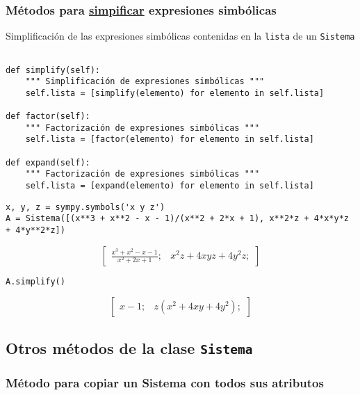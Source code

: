 \documentclass[11pt]{report}
\begin{document}
\subsubsection{Métodos para \href{https://docs.sympy.org/latest/tutorials/intro-tutorial/simplification.html}{simpificar} expresiones simbólicas}
\label{sec:org1226807}

Simplificación de las expresiones simbólicas contenidas en la \texttt{lista} de un \texttt{Sistema}

\begin{verbatim}

def simplify(self):
    """ Simplificación de expresiones simbólicas """
    self.lista = [simplify(elemento) for elemento in self.lista]
                                                               
def factor(self):
    """ Factorización de expresiones simbólicas """
    self.lista = [factor(elemento) for elemento in self.lista]

def expand(self):
    """ Factorización de expresiones simbólicas """
    self.lista = [expand(elemento) for elemento in self.lista]

\end{verbatim}

\begin{verbatim}
x, y, z = sympy.symbols('x y z')
A = Sistema([(x**3 + x**2 - x - 1)/(x**2 + 2*x + 1), x**2*z + 4*x*y*z + 4*y**2*z])
\end{verbatim}

$$\left[ \begin{array}{cc}\frac{x^{3} + x^{2} - x - 1}{x^{2} + 2 x + 1};& x^{2} z + 4 x y z + 4 y^{2} z;\end{array} \right]$$

\begin{verbatim}
A.simplify()
\end{verbatim}

$$\left[ \begin{array}{cc}x - 1;& z \left(x^{2} + 4 x y + 4 y^{2}\right);\end{array} \right]$$

\subsection{Otros métodos de la clase \texttt{Sistema}}
\label{sec:org3b9b6ce}
\subsubsection{Método para copiar un Sistema con todos sus atributos}
\label{sec:orgfe33b74}
\end{document}
